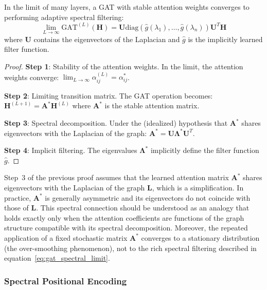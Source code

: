 \begin{theorem}\label{thm:gat_spectral_connection}
In the limit of many layers, a \gls{GAT} with stable attention weights converges to performing adaptive spectral filtering:
\begin{equation}
    \lim_{L \to \infty} \text{GAT}^{(L)}(\mathbf{H}) = \mathbf{U} \text{diag}(\hat{g}(\lambda_1), \ldots, \hat{g}(\lambda_n)) \mathbf{U}^T \mathbf{H}
    \label{eq:gat_spectral_limit}
\end{equation}
where $\mathbf{U}$ contains the eigenvectors of the Laplacian and $\hat{g}$ is the implicitly learned filter function.
\end{theorem}

\begin{proof}
\textbf{Step 1}: Stability of the attention weights.
In the limit, the attention weights converge: $\lim_{L \to \infty} \alpha_{ij}^{(L)} = \alpha_{ij}^*$.

\textbf{Step 2}: Limiting transition matrix.
The \gls{GAT} operation becomes: $\mathbf{H}^{(L+1)} = \mathbf{A}^* \mathbf{H}^{(L)}$ where $\mathbf{A}^*$ is the stable attention matrix.

\textbf{Step 3}: Spectral decomposition.
Under the (idealized) hypothesis that $\mathbf{A}^*$ shares eigenvectors with the Laplacian of the graph: $\mathbf{A}^* = \mathbf{U} \mathbf{\Lambda}^* \mathbf{U}^T$.

\textbf{Step 4}: Implicit filtering.
The eigenvalues $\mathbf{\Lambda}^*$ implicitly define the filter function $\hat{g}$.
\end{proof}

\begin{remark}
Step~3 of the previous proof assumes that the learned attention matrix $\mathbf{A}^*$ shares eigenvectors with the Laplacian of the graph $\mathbf{L}$, which is a simplification. In practice, $\mathbf{A}^*$ is generally asymmetric and its eigenvectors do not coincide with those of $\mathbf{L}$. This spectral connection should be understood as an analogy that holds exactly only when the attention coefficients are functions of the graph structure compatible with its spectral decomposition. Moreover, the repeated application of a fixed stochastic matrix $\mathbf{A}^*$ converges to a stationary distribution (the over-smoothing phenomenon), not to the rich spectral filtering described in equation~\eqref{eq:gat_spectral_limit}.
\end{remark}

\subsubsection{Spectral Positional Encoding}\label{subsubsec:codificacion_posicional_espectral}

